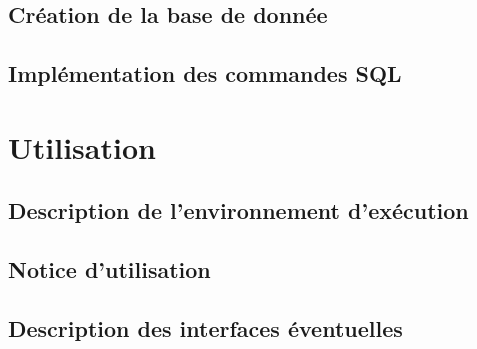 \documentclass[a4paper,10.5pt]{article}
\begin{document}
\subsection{Création de la base de donnée}
\subsection{Implémentation des commandes SQL}

\section{Utilisation}
\subsection{Description de l'environnement d'exécution}
\subsection{Notice d'utilisation}
\subsection{Description des interfaces éventuelles}
\end{document}
